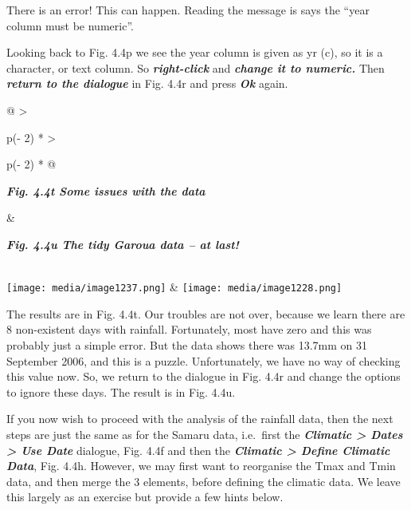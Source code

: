 \documentclass[
  letterpaper,
  DIV=11,
  numbers=noendperiod]{scrreprt}
\begin{document}
There is an error! This can happen. Reading the message is says the
``year column must be numeric''.

Looking back to Fig. 4.4p we see the year column is given as yr (c), so
it is a character, or text column. So \textbf{\emph{right-click}} and
\textbf{\emph{change it to numeric.}} Then \textbf{\emph{return to the
dialogue}} in Fig. 4.4r and press \textbf{\emph{Ok}} again.

\begin{longtable}[]{@{}
  >{\raggedright\arraybackslash}p{(\columnwidth - 2\tabcolsep) * }
  >{\raggedright\arraybackslash}p{(\columnwidth - 2\tabcolsep) * }@{}}
\toprule\noalign{}
\begin{minipage}[b]{\linewidth}\raggedright
\textbf{\emph{Fig. 4.4t Some issues with the data}}
\end{minipage} & \begin{minipage}[b]{\linewidth}\raggedright
\textbf{\emph{Fig. 4.4u The tidy Garoua data -- at last!}}
\end{minipage} \\
\midrule\noalign{}
\endhead
\bottomrule\noalign{}
\endlastfoot
\texttt{[image: media/image1237.png]}
&
\texttt{[image: media/image1228.png]} \\
\end{longtable}

The results are in Fig. 4.4t. Our troubles are not over, because we
learn there are 8 non-existent days with rainfall. Fortunately, most
have zero and this was probably just a simple error. But the data shows
there was 13.7mm on 31 September 2006, and this is a puzzle.
Unfortunately, we have no way of checking this value now. So, we return
to the dialogue in Fig. 4.4r and change the options to ignore these
days. The result is in Fig. 4.4u.

If you now wish to proceed with the analysis of the rainfall data, then
the next steps are just the same as for the Samaru data, i.e.~first the
\textbf{\emph{Climatic \textgreater{} Dates \textgreater{} Use Date}}
dialogue, Fig. 4.4f and then the \textbf{\emph{Climatic \textgreater{}
Define Climatic Data}}, Fig. 4.4h. However, we may first want to
reorganise the Tmax and Tmin data, and then merge the 3 elements, before
defining the climatic data. We leave this largely as an exercise but
provide a few hints below.
\end{document}
